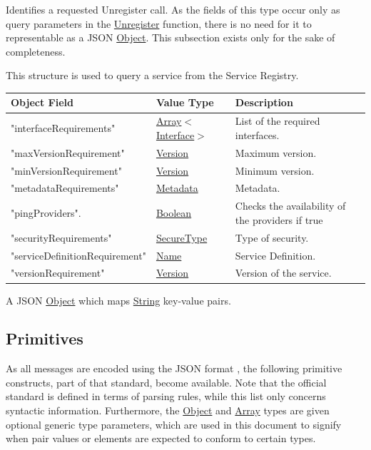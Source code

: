 \documentclass[a4paper]{arrowhead}
\newcommand{\fref}[1]{{\textcolor{ArrowheadBlue}{\hyperref[sec:functions:#1]{#1}}}}
\newcommand{\pref}[1]{{\textcolor{ArrowheadGrey}{\hyperref[sec:model:primitives:#1]{#1}}}}
\begin{document}

Identifies a requested Unregister call.
As the fields of this type occur only as query parameters in the \fref{Unregister} function, there is no need for it to representable as a JSON \pref{Object}.
This subsection exists only for the sake of completeness.


This structure is used to query a service from the Service Registry.

\begin{table}[ht!]
\begin{tabularx}{\textwidth}{| p{5cm} | p{3.5cm} | X |} \hline
\rowcolor{gray!33} Object Field & Value Type      & Description \\ \hline
"interfaceRequirements"                   & \pref{Array}$<$\pref{Interface}$>$     & List of the required interfaces. \\ \hline
"maxVersionRequirement"                & \pref{Version}     & Maximum version. \\ \hline
"minVersionRequirement"                & \pref{Version}     & Minimum version. \\ \hline
"metadataRequirements"                  & \pref{Metadata}     & Metadata. \\ \hline
"pingProviders".                    & \pref{Boolean} & Checks the availability of the providers if true \\ \hline
"securityRequirements"                    &\pref{SecureType}  & Type of security. \\ \hline
"serviceDefinitionRequirement"         &\pref{Name}        & Service Definition. \\ \hline
"versionRequirement"                   &\pref{Version}     & Version of the service. \\ \hline
\end{tabularx}
\end{table}


A JSON \pref{Object} which maps \pref{String} key-value pairs.

\subsection{Primitives}
\label{sec:model:primitives}

As all messages are encoded using the JSON format \cite{bray2014json}, the following primitive constructs, part of that standard, become available.
Note that the official standard is defined in terms of parsing rules, while this list only concerns syntactic information.
Furthermore, the \pref{Object} and \pref{Array} types are given optional generic type parameters, which are used in this document to signify when pair values or elements are expected to conform to certain types. 
\end{document}
